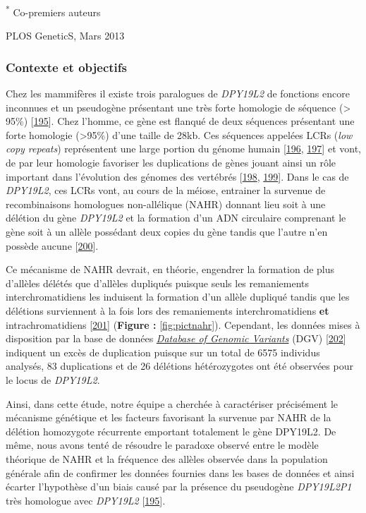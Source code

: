 \documentclass[12pt,a4paper,twoside]{ugathesis}
\theoremstyle{definition}
\theoremstyle{definition}
\theoremstyle{definition}
\theoremstyle{remark}
\begin{document}
\textsuperscript{*} Co-premiers auteurs

PLOS GeneticS, Mars 2013

\newpage

\subsubsection{Contexte et objectifs}\label{contexte-et-objectifs-5}

Chez les mammifères il existe trois paralogues de \emph{DPY19L2} de
fonctions encore inconnues et un pseudogène présentant une très forte
homologie de séquence (\textgreater{} 95\%)
{[}\protect\hyperlink{ref-Carson2006}{195}{]}. Chez l'homme, ce gène est
flanqué de deux séquences présentant une forte homologie
(\textgreater{}95\%) d'une taille de 28kb. Ces séquences appelées LCRs
(\emph{low copy repeats}) représentent une large portion du génome
humain {[}\protect\hyperlink{ref-Cheung2003}{196},
\protect\hyperlink{ref-Bailey2002}{197}{]} et vont, de par leur
homologie favoriser les duplications de gènes jouant ainsi un rôle
important dans l'évolution des génomes des vertébrés
{[}\protect\hyperlink{ref-Walsh2003}{198},
\protect\hyperlink{ref-Ohno1970}{199}{]}. Dans le cas de \emph{DPY19L2},
ces LCRs vont, au cours de la méiose, entrainer la survenue de
recombinaisons homologues non-allélique (NAHR) donnant lieu soit à une
délétion du gène \emph{DPY19L2} et la formation d'un ADN circulaire
comprenant le gène soit à un allèle possédant deux copies du gène tandis
que l'autre n'en possède aucune
{[}\protect\hyperlink{ref-Harbuz2011a}{200}{]}.

Ce mécanisme de NAHR devrait, en théorie, engendrer la formation de plus
d'allèles délétés que d'allèles dupliqués puisque seuls les remaniements
interchromatidiens les induisent la formation d'un allèle dupliqué
tandis que les délétions surviennent à la fois lors des remaniements
interchromatidiens \textbf{et} intrachromatidiens
{[}\protect\hyperlink{ref-Liu2012}{201}{]} (\textbf{Figure :
}\ref{fig:pictnahr}). Cependant, les données mises à disposition par la
base de données \href{http://dgv.tcag.ca/dgv/app/home}{\emph{Database of
Genomic Variants}} (DGV)
{[}\protect\hyperlink{ref-MacDonald2014}{202}{]} indiquent un excès de
duplication puisque sur un total de 6575 individus analysés, 83
duplications et de 26 délétions hétérozygotes ont été observées pour le
locus de \emph{DPY19L2}.

Ainsi, dans cette étude, notre équipe a cherchée à caractériser
précisément le mécanisme génétique et les facteurs favorisant la
survenue par NAHR de la délétion homozygote récurrente emportant
totalement le gène DPY19L2. De même, nous avons tenté de résoudre le
paradoxe observé entre le modèle théorique de NAHR et la fréquence des
allèles observée dans la population générale afin de confirmer les
données fournies dans les bases de données et ainsi écarter l'hypothèse
d'un biais causé par la présence du pseudogène \emph{DPY19L2P1} très
homologue avec \emph{DPY19L2}
{[}\protect\hyperlink{ref-Carson2006}{195}{]}.
\end{document}
